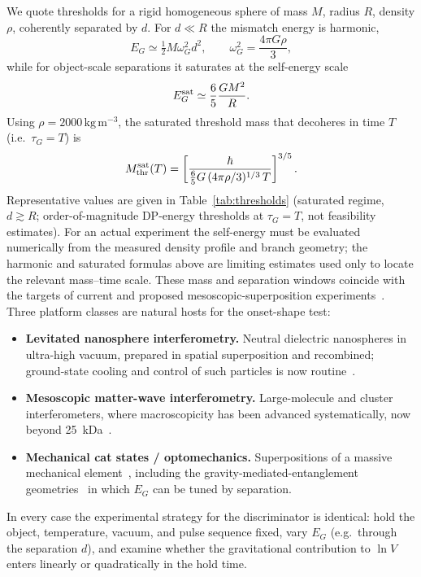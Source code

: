 \documentclass[aps,prd,onecolumn,amsmath,amssymb,nofootinbib,superscriptaddress]{revtex4-2}
\begin{document}
We quote thresholds for a rigid homogeneous sphere of mass $M$, radius $R$, density $\rho$,
coherently separated by $d$. For $d\ll R$ the mismatch energy is harmonic,
\begin{equation}
E_G\simeq\tfrac12 M\omega_G^2 d^2,\qquad \omega_G^2=\frac{4\pi G\rho}{3},
\end{equation}
while for object-scale separations it saturates at the self-energy scale
\begin{equation}
E_G^{\rm sat}\simeq\frac{6}{5}\frac{GM^2}{R}.
\end{equation}
Using $\rho=2000\,\mathrm{kg\,m^{-3}}$, the saturated threshold mass that decoheres in time $T$
(i.e.\ $\tau_G=T$) is
\begin{equation}
M_{\rm thr}^{\rm sat}(T)=\left[\frac{\hbar}{\tfrac65 G\,(4\pi\rho/3)^{1/3}\,T}\right]^{3/5}.
\end{equation}
Representative values are given in Table~\ref{tab:thresholds} (saturated regime, $d\gtrsim R$;
order-of-magnitude DP-energy thresholds at $\tau_G=T$, not feasibility estimates). For an actual
experiment the self-energy must be evaluated numerically from the measured density profile and branch
geometry; the harmonic and saturated formulas above are limiting estimates used only to locate the
relevant mass--time scale. These mass and separation windows coincide with the targets of current and
proposed mesoscopic-superposition experiments~\cite{R16,R17,R19,R23,R26,R27,R28}. Three platform
classes are natural hosts for the onset-shape test:
\begin{itemize}
\item \textbf{Levitated nanosphere interferometry.} Neutral dielectric nanospheres in ultra-high
vacuum, prepared in spatial superposition and recombined; ground-state cooling and control of such
particles is now routine~\cite{R27,R28}.
\item \textbf{Mesoscopic matter-wave interferometry.} Large-molecule and cluster interferometers,
where macroscopicity has been advanced systematically, now beyond 25~kDa~\cite{R16,R23,R26}.
\item \textbf{Mechanical cat states / optomechanics.} Superpositions of a massive mechanical
element~\cite{R19}, including the gravity-mediated-entanglement geometries~\cite{R17,R18} in which
$E_G$ can be tuned by separation.
\end{itemize}
In every case the experimental strategy for the discriminator is identical: hold the object,
temperature, vacuum, and pulse sequence fixed, vary $E_G$ (e.g.\ through the separation $d$), and
examine whether the gravitational contribution to $\ln V$ enters linearly or quadratically in the
hold time.
\end{document}
